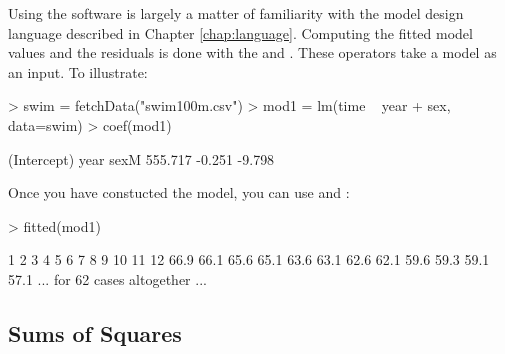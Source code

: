 


Using the  software is largely a matter of familiarity 
with the model design language described in Chapter \ref{chap:language}.  
Computing the fitted model values and the residuals is 
done with the  and .  These operators take
a model as an input.  To illustrate:




\begin{Schunk}
\begin{Sinput}
> swim = fetchData("swim100m.csv")
> mod1 = lm(time ~ year + sex, data=swim)
> coef(mod1)
\end{Sinput}
\begin{Soutput}
(Intercept)        year        sexM 
    555.717      -0.251      -9.798 
\end{Soutput}
\end{Schunk}

\datasetSwimming

Once you have constucted the model, you can use  and
: 
\begin{Schunk}
\begin{Sinput}
> fitted(mod1)
\end{Sinput}
\end{Schunk}
\begin{Schunk}
\begin{Soutput}
   1    2    3    4    5    6    7    8    9   10   11   12 
66.9 66.1 65.6 65.1 63.6 63.1 62.6 62.1 59.6 59.3 59.1 57.1 
... for 62 cases altogether ...
\end{Soutput}
\end{Schunk}

\subsection{Sums of Squares}



